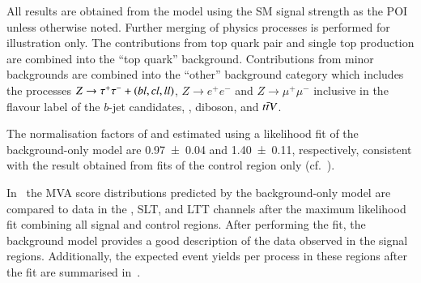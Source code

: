All results are obtained from the model using the SM \HH signal
strength as the POI unless otherwise noted. Further merging of physics
processes is performed for illustration only. The contributions from
top quark pair and single top production are combined into the ``top
quark'' background. Contributions from minor backgrounds are combined
into the ``other'' background category which includes the processes
$Z \to \tau^{+} \tau^{-} + (bl,cl,ll)$, $Z \to e^{+}e^{-}$ and
$Z \to \mu^{+}\mu^{-}$ inclusive in the flavour label of the $b$-jet
candidates, \Wjets, diboson, and $t\bar{t} V$.

The normalisation factors of \ttbar and \ZHF estimated using a
likelihood fit of the background-only model are \num{0.97 +- 0.04} and
\num{1.40 +- 0.11}, respectively, consistent with the result obtained
from fits of the control region only (cf.\ ).

In~ the MVA score distributions predicted
by the background-only model are compared to data in the \hadhad,
\lephad SLT, and \lephad LTT channels after the maximum likelihood fit
combining all signal and control regions. After performing the fit,
the background model provides a good description of the data observed
in the signal regions. Additionally, the expected event yields per
process in these regions after the fit are summarised
in~.

